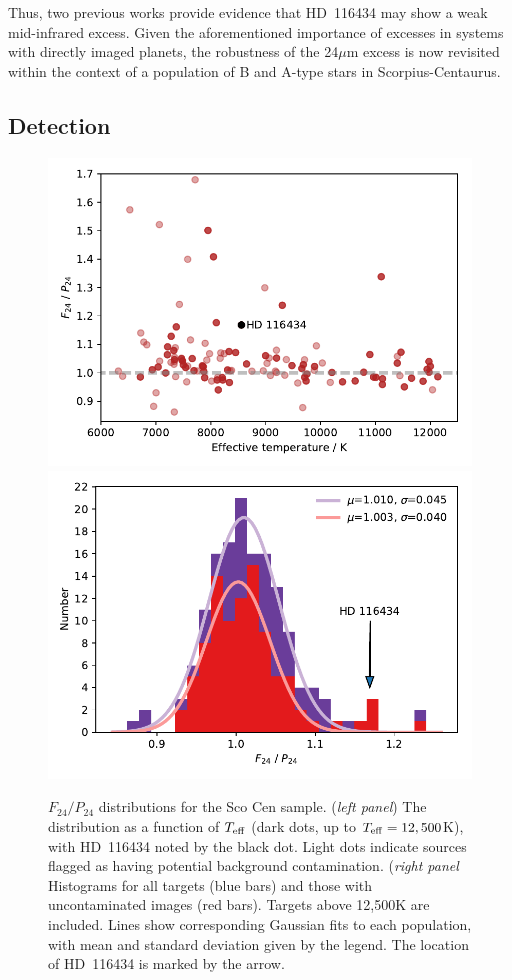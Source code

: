 \documentclass[a4paper,fleqn,usenatbib]{mnras}
\begin{document}
Thus, two previous works provide evidence that HD~116434 may show a weak
mid-infrared excess. Given the aforementioned importance of excesses in
systems with directly imaged planets, the robustness of the 24$\mu$m
excess is now revisited within the context of a population of B and
A-type stars in Scorpius-Centaurus.

\subsection{Detection}\label{s:hd116434:ss:det}

\begin{figure}
  \includegraphics[width=\columnwidth]{r_Teff.pdf}
  \includegraphics[width=\columnwidth]{r.pdf}
  \caption{$F_{24}/P_{24}$ distributions for the Sco Cen
    sample. (\emph{left panel}) The distribution as a function of
    $T_{\rm eff}$ (dark dots, up to $T_{\rm eff}=12,500$K), with
    HD~116434 noted by the black dot. Light dots indicate sources
    flagged as having potential background contamination. (\emph{right
      panel} Histograms for all targets (blue bars) and those with
    uncontaminated images (red bars). Targets above 12,500K are
    included. Lines show corresponding Gaussian fits to each population,
    with mean and standard deviation given by the legend. The location
    of HD~116434 is marked by the arrow.}
    \label{fig:r}
\end{figure}
\end{document}
